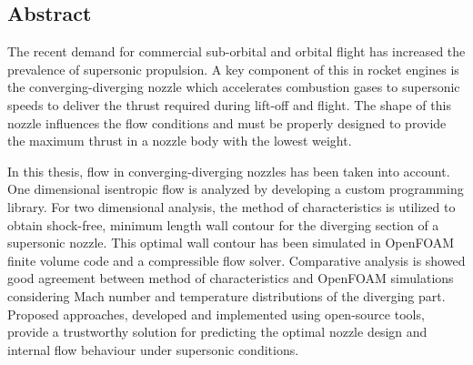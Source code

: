 
\cleardoublepage
{}
\begin{center}
	\section*{Abstract}
\end{center}

The recent demand for commercial sub-orbital and orbital flight has increased the prevalence of supersonic propulsion. A key component of this in rocket engines is the converging-diverging nozzle which accelerates combustion gases to supersonic speeds to deliver the thrust required during lift-off and flight. The shape of this nozzle influences the flow conditions and must be properly designed to provide the maximum thrust in a nozzle body with the lowest weight. 

In this thesis, flow in converging-diverging nozzles has been taken into account. One dimensional isentropic flow is analyzed by developing a custom programming library. For two dimensional analysis, the method of characteristics is utilized to obtain shock-free, minimum length wall contour for the diverging section of a supersonic nozzle. This optimal wall contour has been simulated in OpenFOAM finite volume code and a compressible flow solver. Comparative analysis is showed good agreement between method of characteristics and OpenFOAM simulations considering Mach number and temperature distributions of the diverging part. Proposed approaches, developed and implemented using open-source tools, provide a trustworthy solution for predicting the optimal nozzle design and internal flow behaviour under supersonic conditions. 

\afterpage{\blankpage}

